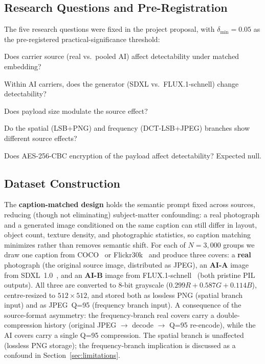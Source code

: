 \documentclass[10pt,twocolumn,a4paper]{article}
\begin{document}
\subsection{Research Questions and Pre-Registration}
The five research questions were fixed in the project proposal, with $\delta_\text{min}\!=\!0.05$ as the pre-registered practical-significance threshold:
\begin{description}[font=\bfseries,leftmargin=1.2em,style=nextline,itemsep=2pt]
\item[RQ1 (primary, confirmatory)] Does carrier source (real vs.\ pooled AI) affect detectability under matched embedding?
\item[RQ2 (primary, confirmatory)] Within AI carriers, does the generator (SDXL vs.\ FLUX.1-schnell) change detectability?
\item[RQ3 (exploratory)] Does payload size modulate the source effect?
\item[RQ4 (exploratory)] Do the spatial (LSB+PNG) and frequency (DCT-LSB+JPEG) branches show different source effects?
\item[RQ5 (verification)] Does AES-256-CBC encryption of the payload affect detectability? Expected null.
\end{description}

\subsection{Dataset Construction}
\label{sec:dataset}
The \textbf{caption-matched design} holds the semantic prompt fixed across sources, reducing (though not eliminating) subject-matter confounding: a real photograph and a generated image conditioned on the same caption can still differ in layout, object count, texture density, and photographic statistics, so caption matching minimizes rather than removes semantic shift. For each of $N\!=\!3{,}000$ groups we draw one caption from COCO~\cite{coco2014} or Flickr30k~\cite{flickr30k2014} and produce three covers: a \textbf{real} photograph (the original source image, distributed as JPEG), an \textbf{AI-A} image from SDXL~1.0~\cite{sdxl2023}, and an \textbf{AI-B} image from FLUX.1-schnell~\cite{flux2024} (both pristine PIL outputs). All three are converted to 8-bit grayscale ($0.299R\!+\!0.587G\!+\!0.114B$), centre-resized to $512\!\times\!512$, and stored both as lossless PNG (spatial branch input) and as JPEG~Q=95 (frequency branch input). A consequence of the source-format asymmetry: the frequency-branch real covers carry a double-compression history (original JPEG $\to$ decode $\to$ Q=95 re-encode), while the AI covers carry a single Q=95 compression. The spatial branch is unaffected (lossless PNG storage); the frequency-branch implication is discussed as a confound in Section~\ref{sec:limitations}.
\end{document}
